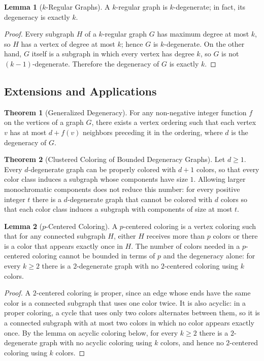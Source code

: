 \documentclass{article}
\theoremstyle{definition}
\newtheorem{theorem}{Theorem}
\newtheorem{lemma}{Lemma}
\begin{document}
\begin{lemma}[$k$-Regular Graphs]
A $k$-regular graph is $k$-degenerate; in fact, its degeneracy is exactly $k$.
\end{lemma}

\begin{proof}
Every subgraph $H$ of a $k$-regular graph $G$ has maximum degree at most $k$, so $H$ has a vertex of degree at most $k$; hence $G$ is $k$-degenerate. On the other hand, $G$ itself is a subgraph in which every vertex has degree $k$, so $G$ is not $(k-1)$-degenerate. Therefore the degeneracy of $G$ is exactly $k$.
\end{proof}

\subsection{Extensions and Applications}

\begin{theorem}[Generalized Degeneracy]
For any non-negative integer function $f$ on the vertices of a graph $G$, there exists a vertex ordering such that each vertex $v$ has at most $d + f(v)$ neighbors preceding it in the ordering, where $d$ is the degeneracy of $G$.
\end{theorem}

\begin{theorem}[Clustered Coloring of Bounded Degeneracy Graphs]
Let $d \geq 1$. Every $d$-degenerate graph can be properly colored with $d+1$ colors, so that every color class induces a subgraph whose components have size $1$. Allowing larger monochromatic components does not reduce this number: for every positive integer $t$ there is a $d$-degenerate graph that cannot be colored with $d$ colors so that each color class induces a subgraph with components of size at most $t$.
\end{theorem}

\begin{lemma}[$p$-Centered Coloring]
A $p$-centered coloring is a vertex coloring such that for any connected subgraph $H$, either $H$ receives more than $p$ colors or there is a color that appears exactly once in $H$. The number of colors needed in a $p$-centered coloring cannot be bounded in terms of $p$ and the degeneracy alone: for every $k \geq 2$ there is a $2$-degenerate graph with no $2$-centered coloring using $k$ colors.
\end{lemma}

\begin{proof}
A $2$-centered coloring is proper, since an edge whose ends have the same color is a connected subgraph that uses one color twice. It is also acyclic: in a proper coloring, a cycle that uses only two colors alternates between them, so it is a connected subgraph with at most two colors in which no color appears exactly once. By the lemma on acyclic coloring below, for every $k \geq 2$ there is a $2$-degenerate graph with no acyclic coloring using $k$ colors, and hence no $2$-centered coloring using $k$ colors.
\end{proof}
\end{document}
